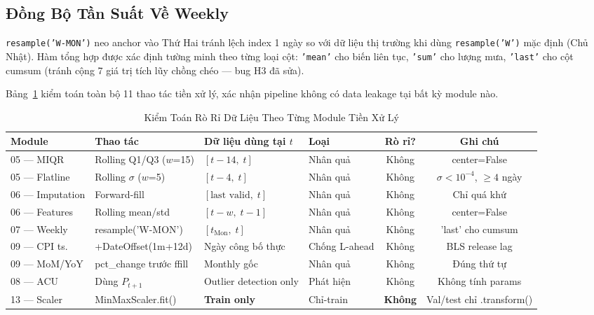 \documentclass[conference]{IEEEtran}
\begin{document}
\subsection{Đồng Bộ Tần Suất Về Weekly}

\texttt{resample('W-MON')} neo anchor vào Thứ Hai tránh lệch index 1 ngày so
với dữ liệu thị trường khi dùng \texttt{resample('W')} mặc định (Chủ Nhật).
Hàm tổng hợp được xác định tường minh theo từng loại cột: \texttt{'mean'} cho
biến liên tục, \texttt{'sum'} cho lượng mưa, \texttt{'last'} cho cột cumsum
(tránh cộng 7 giá trị tích lũy chồng chéo — bug H3 đã sửa).

Bảng~\ref{tab:leakage_audit} kiểm toán toàn bộ 11 thao tác tiền xử lý, xác
nhận pipeline không có data leakage tại bất kỳ module nào.

\begin{table}[htbp]
\caption{Kiểm Toán Rò Rỉ Dữ Liệu Theo Từng Module Tiền Xử Lý}
\label{tab:leakage_audit}
\centering
\begin{threeparttable}
\begin{tabular}{@{}llllcc@{}}
\toprule
\textbf{Module} & \textbf{Thao tác} & \textbf{Dữ liệu dùng tại $t$}
  & \textbf{Loại} & \textbf{Rò rỉ?} & \textbf{Ghi chú} \\
\midrule
05 --- MIQR      & Rolling Q1/Q3 ($w$=15)   & $[t{-}14,\;t]$             & Nhân quả     & Không & center=False \\
05 --- Flatline  & Rolling $\sigma$ ($w$=5)  & $[t{-}4,\;t]$              & Nhân quả     & Không & $\sigma < 10^{-4}$, $\geq 4$ ngày \\
06 --- Imputation& Forward-fill             & $[\text{last valid},\;t]$  & Nhân quả     & Không & Chỉ quá khứ \\
06 --- Features  & Rolling mean/std          & $[t{-}w,\;t{-}1]$          & Nhân quả     & Không & center=False \\
07 --- Weekly    & resample('W-MON')         & $[t_\text{Mon},\;t]$       & Nhân quả     & Không & 'last' cho cumsum \\
09 --- CPI ts.   & +DateOffset(1m+12d)       & Ngày công bố thực          & Chống L-ahead& Không & BLS release lag \\
09 --- MoM/YoY   & pct\_change trước ffill  & Monthly gốc                & Nhân quả     & Không & Đúng thứ tự \\
08 --- ACU       & Dùng $P_{t+1}$           & Outlier detection only     & Phát hiện    & Không\tnote{a} & Không tính params \\
13 --- Scaler    & MinMaxScaler.fit()        & \textbf{Train only}        & Chỉ-train    & \textbf{Không} & Val/test chỉ .transform() \\

\end{tabular}
\end{threeparttable}
\end{table}
\end{document}
